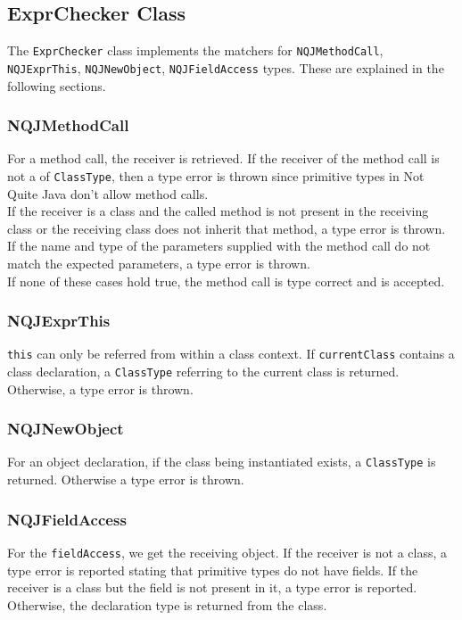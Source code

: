 \documentclass[]{tukportfolio}
\begin{document}
\subsection{ExprChecker Class} \label{exprChecker}

The \lstinline|ExprChecker| class implements the matchers for \lstinline|NQJMethodCall|, \lstinline|NQJExprThis|, \lstinline|NQJNewObject|, \lstinline|NQJFieldAccess| types. These are explained in the following sections.

\subsubsection{NQJMethodCall}
For a method call, the receiver is retrieved. If the receiver of the method call is not a of \lstinline|ClassType|, then a type error is thrown since primitive types in Not Quite Java don't allow method calls.\\
If the receiver is a class and the called method is not present in the receiving class or the receiving class does not inherit that method, a type error is thrown.\\
If the name and type of the parameters supplied with the method call do not match the expected parameters, a type error is thrown.\\
If none of these cases hold true, the method call is type correct and is accepted.

\subsubsection{NQJExprThis}
\lstinline|this| can only be referred from within a class context. If \lstinline|currentClass| contains a class declaration, a \lstinline|ClassType| referring to the current class is returned. Otherwise, a type error is thrown.

\subsubsection{NQJNewObject}

For an object declaration, if the class being instantiated exists, a \lstinline|ClassType| is returned. Otherwise a type error is thrown.

\subsubsection{NQJFieldAccess}
For the \lstinline|fieldAccess|, we get the receiving object. If the receiver is not a class, a type error is reported stating that primitive types do not have fields. If the receiver is a class but the field is not present in it, a type error is reported. Otherwise, the declaration type is returned from the class.
\end{document}
